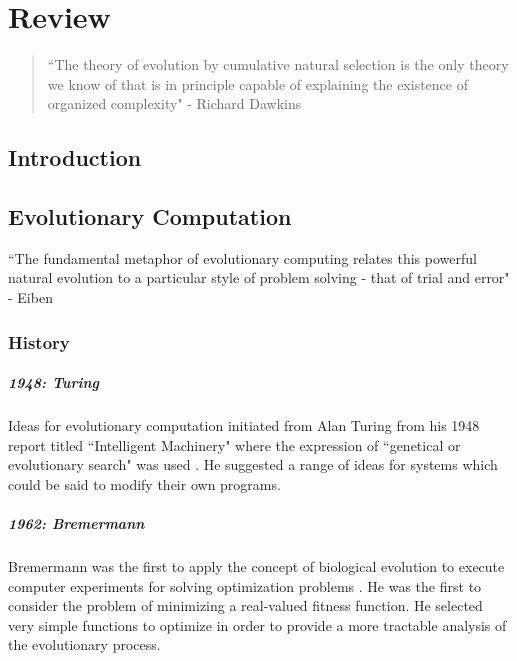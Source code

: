 \chapter{Review}

\begin{quote}
``The theory of evolution by cumulative natural selection is the only theory we know of that is in principle capable of explaining the existence of organized complexity" - Richard Dawkins \cite{dawkins1996}
\end{quote}

\section{Introduction}

\section{Evolutionary Computation}

``The fundamental metaphor of evolutionary computing relates this powerful natural evolution to a particular style of problem solving - that of trial and error" - Eiben \cite{eiben2003}

\subsection{History}

\paragraph{1948: Turing}
Ideas for evolutionary computation initiated from Alan Turing from his 1948 report titled ``Intelligent Machinery" where the expression of ``genetical or evolutionary search"  was used \cite{turing1948}. He suggested a range of ideas for systems which could be said to modify their own programs. 

\paragraph{1962: Bremermann}
Bremermann was the first to apply the concept of biological evolution to execute computer experiments for solving optimization problems \cite{bremermann1962}. He was the first to consider the problem of minimizing a real-valued fitness function. He selected very simple functions to optimize in order to provide a more tractable analysis of the evolutionary process.

